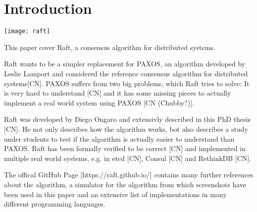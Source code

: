 




\begin{titlepage}
\afterpage{\restorepagecolor}
\newcommand{\colorRule}[3][black]{\textcolor[HTML]{#1}{\rule{#2}{#3}}}
\end{titlepage}
\restoregeometry



{
\hypersetup{linkcolor=}
\setcounter{tocdepth}{2}
\tableofcontents
\pagebreak
}

\section{Introduction}

\texttt{[image: raft]}

This paper cover Raft, a consensus algorithm for distributed systems.

Raft wants to be a simpler replacement for PAXOS, an algorithm developed by Leslie Lamport and considered the reference consensus algorithm for distributed systems[CN]. PAXOS suffers from two big problems, which Raft tries to solve: It is very hard to understand [CN] and it has some missing pieces to actually implement a real world system using PAXOS [CN (Chubby?)].

Raft was developed by Diego Ongaro and extensivly described in this PhD thesis [CN]. He not only describes how the algorithm works, bot also describes a study under students to test if the algorithm is actually easier to understand than PAXOS. Raft has been formally verified to be correct [CN] and implemented in multiple real world systems, e.g. in etcd [CN], Consul [CN] and RethinkDB [CN].

The offical GitHub Page [https://raft.github.io/] contains many further references about the algorithm, a simulator for the algorithm from which screenshots have been used in this paper and an extensive list of implementations in many different programming languages.

